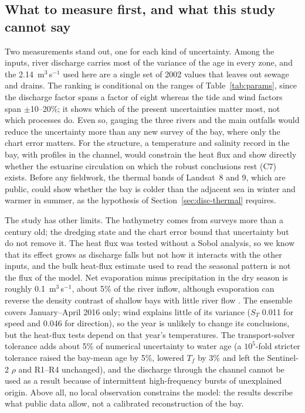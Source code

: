 \documentclass[a4paper,fleqn]{ems-dc}
\begin{document}
\subsection{What to measure first, and what this study cannot say}\label{sec:measure}
Two measurements stand out, one for each kind of uncertainty. Among the inputs, river
discharge carries most of the variance of the age in every zone, and the
2.14~m$^3$\,s$^{-1}$ used here are a single set of 2002 values that leaves out sewage and
drains. The ranking is conditional on the ranges of Table~\ref{tab:params}, since the
discharge factor spans a factor of eight whereas the tide and wind factors span
$\pm$10--20\%; it shows which of the present uncertainties matter most, not which processes
do. Even so, gauging the three rivers and the main outfalls would reduce the uncertainty more
than any new survey of the bay, where only the chart error matters. For the structure, a
temperature and salinity record in the bay, with profiles in the channel, would constrain
the heat flux and show directly whether the estuarine circulation on which the robust
conclusions rest (C7) exists. Before any fieldwork, the thermal bands of Landsat~8 and 9,
which are public, could show whether the bay is colder than the adjacent sea in winter and
warmer in summer, as the hypothesis of Section~\ref{sec:disc-thermal} requires.

The study has other limits. The bathymetry comes from surveys more than a century old; the
dredging state and the chart error bound that uncertainty but do not remove it. The heat flux
was tested without a Sobol analysis, so we know that its effect grows as discharge falls but
not how it interacts with the other inputs, and the bulk heat-flux estimate used to read the
seasonal pattern is not the flux of the model. Net evaporation minus precipitation in the dry
season is roughly 0.1~m$^3$\,s$^{-1}$, about 5\% of the river inflow, although evaporation
can reverse the density contrast of shallow bays with little river flow \citep{Largier1997}.
The ensemble covers January--April 2016 only; wind explains little of its variance ($S_T$
0.011 for speed and 0.046 for direction), so the year is unlikely to change its conclusions,
but the heat-flux tests depend on that year's temperatures. The transport-solver tolerance
adds about 5\% of numerical uncertainty to water age (a $10^5$-fold stricter tolerance raised
the bay-mean age by 5\%, lowered $T_f$ by 3\% and left the Sentinel-2 $\rho$ and R1--R4
unchanged), and the discharge through the channel cannot be used as a result because of
intermittent high-frequency bursts of unexplained origin. Above all, no local observation
constrains the model: the results describe what public data allow, not a calibrated
reconstruction of the bay.
\end{document}
